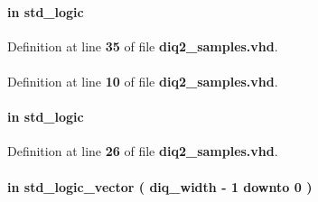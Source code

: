 \paragraph[{mimo\+\_\+en}]{ {\bfseries \textcolor{keywordflow}{in}\textcolor{vhdlchar}{ }} {\bfseries \textcolor{comment}{std\+\_\+logic}\textcolor{vhdlchar}{ }} \hspace{0.3cm}{\ttfamily [Port]}}\label{classdiq2__samples_a0c57670aee4f9fbfa3c286573012965a}


Definition at line {\bf 35} of file {\bf diq2\+\_\+samples.\+vhd}.

\paragraph[{numeric\+\_\+std}]{\hspace{0.3cm}{\ttfamily [Package]}}\label{classdiq2__samples_a2edc34402b573437d5f25fa90ba4013e}


Definition at line {\bf 10} of file {\bf diq2\+\_\+samples.\+vhd}.

\paragraph[{reset\+\_\+n}]{ {\bfseries \textcolor{keywordflow}{in}\textcolor{vhdlchar}{ }} {\bfseries \textcolor{comment}{std\+\_\+logic}\textcolor{vhdlchar}{ }} \hspace{0.3cm}{\ttfamily [Port]}}\label{classdiq2__samples_a446ea52ed8c4a84181a47d9165ce41a5}


Definition at line {\bf 26} of file {\bf diq2\+\_\+samples.\+vhd}.

\paragraph[{rxiq}]{ {\bfseries \textcolor{keywordflow}{in}\textcolor{vhdlchar}{ }} {\bfseries \textcolor{comment}{std\+\_\+logic\+\_\+vector}\textcolor{vhdlchar}{ }\textcolor{vhdlchar}{(}\textcolor{vhdlchar}{ }\textcolor{vhdlchar}{ }\textcolor{vhdlchar}{ }\textcolor{vhdlchar}{ }{\bfseries {\bf diq\+\_\+width}} \textcolor{vhdlchar}{-\/}\textcolor{vhdlchar}{ } \textcolor{vhdldigit}{1} \textcolor{vhdlchar}{ }\textcolor{keywordflow}{downto}\textcolor{vhdlchar}{ }\textcolor{vhdlchar}{ } \textcolor{vhdldigit}{0} \textcolor{vhdlchar}{ }\textcolor{vhdlchar}{)}\textcolor{vhdlchar}{ }} \hspace{0.3cm}{\ttfamily [Port]}}\label{classdiq2__samples_ac648708437dafac19c0215e8fd74833a}



